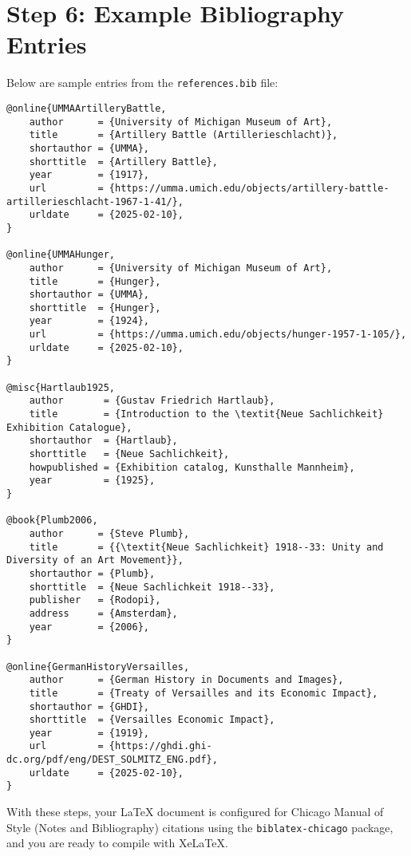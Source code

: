 \documentclass{article}
\begin{document}
\vspace{1em}
\clearpage

\section*{Step 6: Example Bibliography Entries}

Below are sample entries from the \texttt{references.bib} file:

\begin{lstlisting}
@online{UMMAArtilleryBattle,
    author      = {University of Michigan Museum of Art},
    title       = {Artillery Battle (Artillerieschlacht)},
    shortauthor = {UMMA},
    shorttitle  = {Artillery Battle},
    year        = {1917},
    url         = {https://umma.umich.edu/objects/artillery-battle-artillerieschlacht-1967-1-41/},
    urldate     = {2025-02-10},
}

@online{UMMAHunger,
    author      = {University of Michigan Museum of Art},
    title       = {Hunger},
    shortauthor = {UMMA},
    shorttitle  = {Hunger},
    year        = {1924},
    url         = {https://umma.umich.edu/objects/hunger-1957-1-105/},
    urldate     = {2025-02-10},
}

@misc{Hartlaub1925,
    author       = {Gustav Friedrich Hartlaub},
    title        = {Introduction to the \textit{Neue Sachlichkeit} Exhibition Catalogue},
    shortauthor  = {Hartlaub},
    shorttitle   = {Neue Sachlichkeit},
    howpublished = {Exhibition catalog, Kunsthalle Mannheim},
    year         = {1925},
}

@book{Plumb2006,
    author      = {Steve Plumb},
    title       = {{\textit{Neue Sachlichkeit} 1918--33: Unity and Diversity of an Art Movement}},
    shortauthor = {Plumb},
    shorttitle  = {Neue Sachlichkeit 1918--33},
    publisher   = {Rodopi},
    address     = {Amsterdam},
    year        = {2006},
}

@online{GermanHistoryVersailles,
    author      = {German History in Documents and Images},
    title       = {Treaty of Versailles and its Economic Impact},
    shortauthor = {GHDI},
    shorttitle  = {Versailles Economic Impact},
    year        = {1919},
    url         = {https://ghdi.ghi-dc.org/pdf/eng/DEST_SOLMITZ_ENG.pdf},
    urldate     = {2025-02-10},
}
\end{lstlisting}

\vspace{1em}

With these steps, your LaTeX document is configured for Chicago Manual of Style (Notes and Bibliography) citations using the \texttt{biblatex-chicago} package, and you are ready to compile with XeLaTeX.
\end{document}
